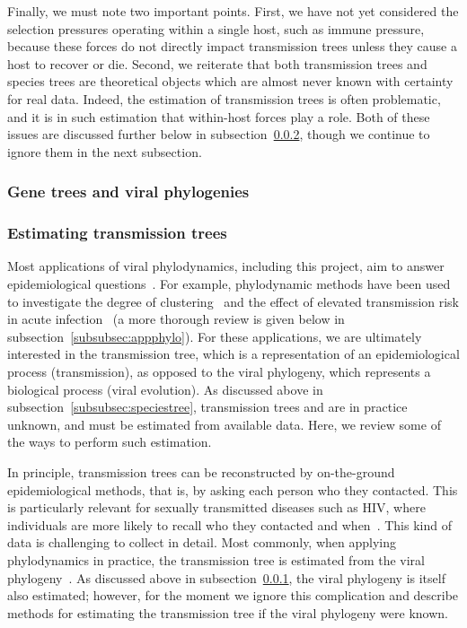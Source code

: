 Finally, we must note two important points. First, we have not yet considered
the selection pressures operating within a single host, such as immune
pressure, because these forces do not directly impact transmission trees unless
they cause a host to recover or die. Second, we reiterate that both
transmission trees and species trees are theoretical objects which are almost
never known with certainty for real data. Indeed, the estimation of
transmission trees is often problematic, and it is in such estimation that
within-host forces play a role. Both of these issues are discussed further
below in subsection~\ref{subsubsec:treeconv}, though we continue to ignore them
in the next subsection.

\subsubsection{Gene trees and viral phylogenies}
\label{subsubsec:genetree}

\subsubsection{Estimating transmission trees}
\label{subsubsec:treeconv}

Most applications of viral phylodynamics, including this project, aim to answer
epidemiological questions~\autocite{volz2013viral}. For example, phylodynamic
methods have been used to investigate the degree of
clustering~\autocite{hughes2009molecular} and the effect of elevated
transmission risk in acute infection~\autocite{volz2012simple} (a more thorough
review is given below in subsection~\ref{subsubsec:appphylo}). For these
applications, we are ultimately interested in the transmission tree, which is a
representation of an epidemiological process (transmission), as opposed to the
viral phylogeny, which represents a biological process (viral evolution). As
discussed above in subsection~\ref{subsubsec:speciestree}, transmission trees and
are in practice unknown, and must be estimated from available data. Here, we
review some of the ways to perform such estimation.

In principle, transmission trees can be reconstructed by on-the-ground
epidemiological methods, that is, by asking each person who they contacted.
This is particularly relevant for sexually transmitted diseases such as HIV,
where individuals are more likely to recall who they contacted and
when~\autocite{klovdahl1985social}. This kind of data is challenging to collect
in detail. Most commonly, when applying phylodynamics in practice, the
transmission tree is estimated from the viral
phylogeny~\autocite{volz2013viral}. As discussed above in
subsection~\ref{subsubsec:genetree}, the viral phylogeny is itself also estimated;
however, for the moment we ignore this complication and describe methods for
estimating the transmission tree if the viral phylogeny were known.

